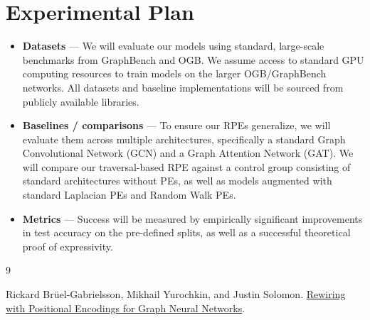 \documentclass{acmart}
\begin{document}
\section{Experimental Plan}

\begin{itemize}
  \item[•] \textbf{Datasets} — We will evaluate our models using standard, large-scale benchmarks from GraphBench and OGB. We assume access to standard GPU computing resources to train models on the larger OGB/GraphBench networks. All datasets and baseline implementations will be sourced from publicly available libraries.
  \item[•] \textbf{Baselines / comparisons} — To ensure our RPEs generalize, we will evaluate them across multiple architectures, specifically a standard Graph Convolutional Network (GCN) and a Graph Attention Network (GAT). We will compare our traversal-based RPE against a control group consisting of standard architectures without PEs, as well as models augmented with standard Laplacian PEs and Random Walk PEs. 
  \item[•] \textbf{Metrics} — Success will be measured by empirically significant improvements in test accuracy on the pre-defined splits, as well as a successful theoretical proof of expressivity.
\end{itemize}

\begin{thebibliography}{9}

Rickard Brüel-Gabrielsson, Mikhail Yurochkin, and Justin Solomon.
\href{https://arxiv.org/pdf/2201.12674}{Rewiring with Positional Encodings for Graph Neural Networks}.

\end{thebibliography}
\end{document}
